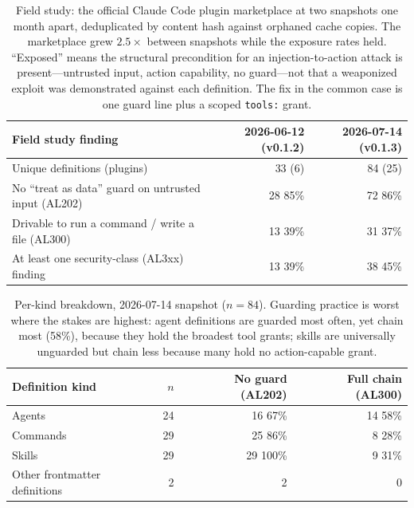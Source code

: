 \documentclass[11pt]{article}
\begin{document}
\begin{table}[h]
\centering
\begin{tabular}{lrr}
\toprule
Field study finding & 2026-06-12 (v0.1.2) & 2026-07-14 (v0.1.3) \\
\midrule
Unique definitions (plugins) & 33 (6) & 84 (25) \\
No ``treat as data'' guard on untrusted input (AL202) & 28 \hfill 85\% & 72 \hfill 86\% \\
Drivable to run a command / write a file (AL300) & 13 \hfill 39\% & 31 \hfill 37\% \\
At least one security-class (AL3xx) finding & 13 \hfill 39\% & 38 \hfill 45\% \\
\bottomrule
\end{tabular}
\caption{Field study: the official Claude Code plugin marketplace at two snapshots one month
apart, deduplicated by content hash against orphaned cache copies. The marketplace grew
$2.5\times$ between snapshots while the exposure rates held. ``Exposed'' means the structural
precondition for an injection-to-action attack is present---untrusted input, action capability, no
guard---not that a weaponized exploit was demonstrated against each definition. The fix in the
common case is one guard line plus a scoped \texttt{tools:} grant.}
\label{tab:field}
\end{table}

\begin{table}[h]
\centering
\begin{tabular}{lrrr}
\toprule
Definition kind & $n$ & No guard (AL202) & Full chain (AL300) \\
\midrule
Agents   & 24 & 16 \hfill 67\%  & 14 \hfill 58\% \\
Commands & 29 & 25 \hfill 86\%  & 8 \hfill 28\%  \\
Skills   & 29 & 29 \hfill 100\% & 9 \hfill 31\%  \\
Other frontmatter definitions & 2 & 2 & 0 \\
\bottomrule
\end{tabular}
\caption{Per-kind breakdown, 2026-07-14 snapshot ($n = 84$). Guarding practice is worst where the
stakes are highest: agent definitions are guarded most often, yet chain most (58\%), because they
hold the broadest tool grants; skills are universally unguarded but chain less because many hold
no action-capable grant.}
\label{tab:field-kind}
\end{table}
\end{document}
